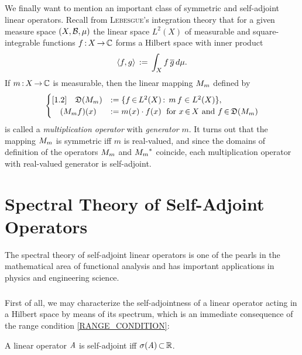 \documentclass[11pt,twoside]{article}
\begin{document}
\subsection{} %
We finally want to mention an important class of symmetric and self-adjoint
linear operators.
Recall from \textsc{Lebesgue}'s integration theory
that for a given measure space $(X,{\mathcal{B}},\mu)$
the linear space $L^2(X)$ of measurable and square-integrable functions
$f{\,:\,}X {\,\to\,} {\mathbb{C}}$ forms a Hilbert space with inner product
\[
\langle f,g \rangle \,:=\, \int_X f \, \overline{g} \, d\mu.
\]
If $m {\,:\,} X {\,\to\,} {\mathbb{C}}$ is measurable,
then the linear mapping ${M}_m$ defined by
\[
\begin{cases}[1.2]
\quad \mathfrak{D}({M}_m) & := \{f {\,\in\,} L^2(X) {\,:\,} \; m \, f \in L^2(X)\}, \\
\quad ({M}_m f)(x)   & := m(x) \cdot f(x)   \;
                            \mbox{ for } x {\,\in\,} X \mbox{ and } f {\,\in\,} \mathfrak{D}({M}_m) \\
\end{cases}
\]
is called a \textit{multiplication operator} with \textit{generator} $m$.
It turns out that the mapping ${M}_m$ is symmetric
iff
$m$ is real-valued,
and since the domains of definition
of the operators ${M}_m$ and ${{M}_m}^*$ coincide,
each multiplication operator with real-valued generator is self-adjoint.

\section{Spectral Theory of Self-Adjoint Operators}                            %
The spectral theory of self-adjoint linear operators is one of the pearls
in the mathematical area of functional analysis
and has important applications in physics and engineering science.

\subparagraph{} %
First of all,
we may characterize the self-adjointness of a linear operator
acting in a Hilbert space by means of its spectrum,
which is an immediate consequence of the range condition \ref{RANGE_CONDITION}:

\begin{theorem}
A linear operator $\mathit{A}$ is self-adjoint
iff $\sigma(\mathit{A}) {\,\subset\,} {\mathbb{R}}$.
\end{theorem}
\end{document}
